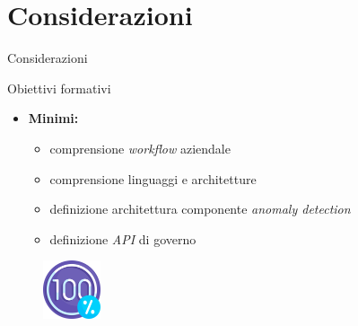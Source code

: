 \documentclass{beamer}
\begin{document}
	\section{Considerazioni}

	\begin{frame}{Considerazioni}
		\begin{block}{Obiettivi formativi}
			\begin{itemize}
				\item \textbf{Minimi:}
					\begin{itemize}
						\item comprensione \textit{workflow} aziendale \vspace{.5em}
						\item comprensione linguaggi e architetture \vspace{.5em}
						\item definizione architettura componente \textit{anomaly detection} \vspace{.5em}
						\item definizione \textit{API} di governo \vspace{.5em}
					\end{itemize}
			\end{itemize}
		\end{block}
		
		\begin{figure}[!h]
    		 \centering
    		\includegraphics[width=1.7cm]{../immagini/slide/100-percent.png}
		\end{figure}
	\end{frame}
	
\end{document}

